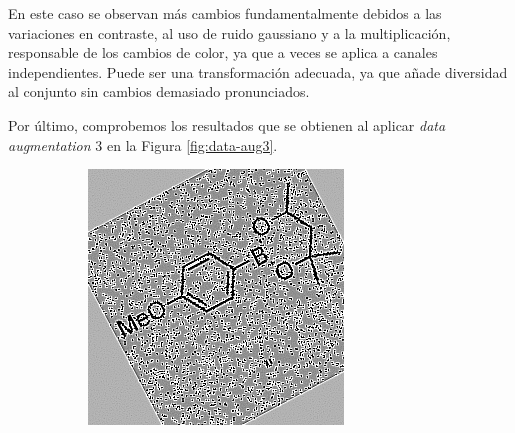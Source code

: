 En este caso se observan más cambios fundamentalmente debidos a las variaciones en contraste, al uso de ruido gaussiano y a la multiplicación, responsable de los cambios de color, ya que a veces se aplica a canales independientes. Puede ser una transformación adecuada, ya que añade diversidad al conjunto sin cambios demasiado pronunciados. 

Por último, comprobemos los resultados que se obtienen al aplicar \textit{data augmentation} 3 en la Figura \ref{fig:data-aug3}.

\begin{figure}[H]
\centering
    \begin{subfigure}{.23\textwidth}
        \centering
        \includegraphics[width=1\linewidth]{imagenes/aug3/175.jpg}
    \end{subfigure}%
    \begin{subfigure}{.23\textwidth}
        \centering

\end{subfigure}
\end{figure}
